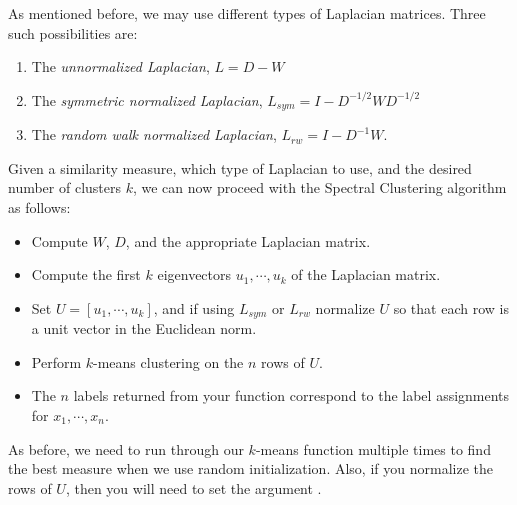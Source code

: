 As mentioned before, we may use different types of Laplacian matrices.  Three such possibilities are:
\begin{enumerate}
    \item The \emph{unnormalized Laplacian}, $L = D - W$
    \item The \emph{symmetric normalized Laplacian}, $L_{sym} = I - D^{-1/2}WD^{-1/2}$
    \item The \emph{random walk normalized Laplacian}, $L_{rw} = I - D^{-1}W$.
 \end{enumerate}

Given a similarity measure, which type of Laplacian to use, and the desired number of clusters $k$, we can now proceed with the Spectral Clustering algorithm as follows:

\begin{itemize}
    \item Compute $W$, $D$, and the appropriate Laplacian matrix.
    \item Compute the first $k$ eigenvectors $u_1, \cdots , u_k$ of the Laplacian matrix.
    \item Set $U = [u_1, \cdots , u_k]$, and if using $L_{sym}$ or $L_{rw}$ normalize $U$ so that each row is a unit vector in the Euclidean norm.
    \item Perform $k$-means clustering on the $n$ rows of $U$.
    \item The $n$ labels returned from your  function correspond to the label assignments for $x_1, \cdots, x_n$.
\end{itemize}

As before, we need to run through our $k$-means function multiple times to find the best measure when we use random initialization.  Also, if you normalize the rows of $U$, then you will need to set the argument .

